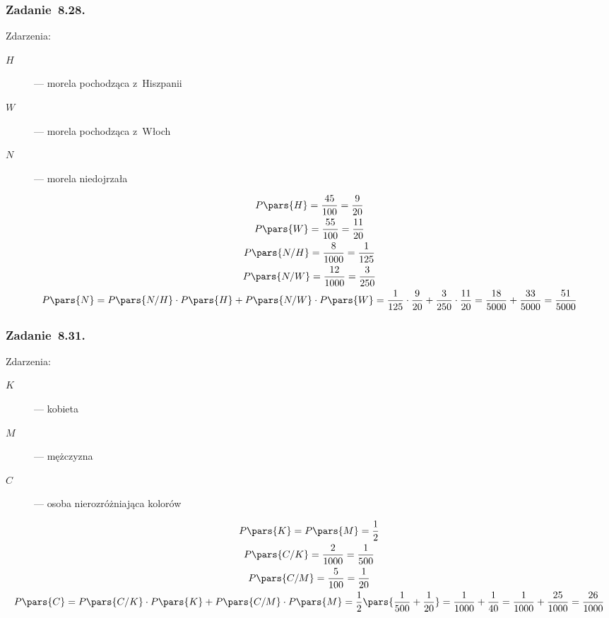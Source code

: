 \subsubsection*{Zadanie~8.28.}
Zdarzenia:
\begin{description}
    \item[\(H\)] --- morela pochodząca z~Hiszpanii
    \item[\(W\)] --- morela pochodząca z~Włoch
    \item[\(N\)] --- morela niedojrzała
\end{description}
\begin{gather*}
    P\pars{H} = \frac{45}{100} = \frac{9}{20}\\
    P\pars{W} = \frac{55}{100} = \frac{11}{20}\\
    P\pars{N / H} = \frac{8}{1000} = \frac{1}{125}\\
    P\pars{N / W} = \frac{12}{1000} = \frac{3}{250}\\
    P\pars{N}
        = P\pars{N / H} \cdot P\pars{H} + P\pars{N / W} \cdot P\pars{W}
        = \frac{1}{125} \cdot \frac{9}{20} + \frac{3}{250} \cdot \frac{11}{20}
        = \frac{18}{5000} + \frac{33}{5000}
        = \frac{51}{5000}
\end{gather*}
\subsubsection*{Zadanie~8.31.}
Zdarzenia:
\begin{description}
    \item[\(K\)] --- kobieta
    \item[\(M\)] --- mężczyzna
    \item[\(C\)] --- osoba nierozróżniająca kolorów
\end{description}
\begin{gather*}
    P\pars{K} = P\pars{M} = \frac{1}{2}\\
    P\pars{C / K} = \frac{2}{1000} = \frac{1}{500}\\
    P\pars{C / M} = \frac{5}{100} = \frac{1}{20}\\
    P\pars{C}
        = P\pars{C / K} \cdot P\pars{K} + P\pars{C / M} \cdot P\pars{M}
        = \frac{1}{2}\pars{\frac{1}{500} + \frac{1}{20}}
        = \frac{1}{1000} + \frac{1}{40}
        = \frac{1}{1000} + \frac{25}{1000}
        = \frac{26}{1000}
\end{gather*}